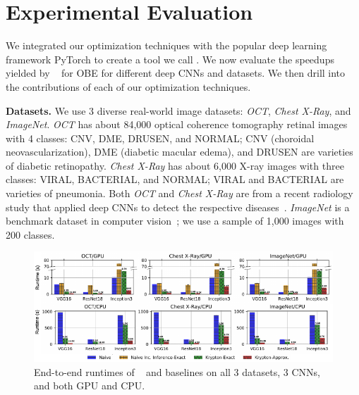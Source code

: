\section{Experimental Evaluation}
We integrated our optimization techniques with the popular deep learning framework PyTorch to create a tool we call \system.  We now evaluate the speedups yielded by \system~ for OBE for different deep CNNs and datasets. We then drill into the contributions of each of our optimization techniques.

\vspace{2mm}
\noindent \textbf{Datasets.}
We use 3 diverse real-world image datasets: \textit{OCT}, \textit{Chest X-Ray}, and \textit{ImageNet}. \textit{OCT} has about 84,000 optical coherence tomography retinal images with 4 classes: CNV, DME, DRUSEN, and NORMAL; CNV (choroidal neovascularization), DME (diabetic macular edema), and DRUSEN are varieties of diabetic retinopathy. \textit{Chest X-Ray} has about 6,000 X-ray images with three classes: VIRAL, BACTERIAL, and NORMAL; VIRAL and BACTERIAL are varieties of pneumonia. Both \textit{OCT} and \textit{Chest X-Ray} are from a recent radiology study that applied deep CNNs to detect the respective diseases~\cite{kermany2018identifying}. \textit{ImageNet} is a benchmark dataset in computer vision~\cite{deng2009imagenet}; we use a sample of 1,000 images with 200 classes.

\begin{figure}[t]
\includegraphics[width=\textwidth]{images/5_1_all_edited_b}
\vspace{-8mm}
\caption{End-to-end runtimes of \system~ and baselines on all 3 datasets, 3 CNNs, and both GPU and CPU.}
\label{fig:5_1_all_edited}
\end{figure}

